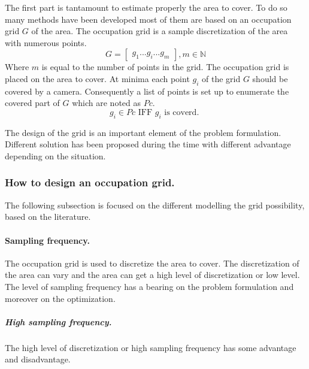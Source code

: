 
The first part is tantamount to estimate properly the area to cover. To do so many methods have been developed most of them are based on an occupation grid $G$ of the area. The occupation grid  is a sample discretization of the area with numerous points.
\begin{equation}\label{eq:Grid}
	G=\begin{bmatrix}
	 	g_1 ...g_i ... g_m
	\end{bmatrix}  , m\in \mathbb{N}
\end{equation}
Where $m$ is equal to the number of points in the grid.
The occupation grid is placed on the area to cover. At minima each point $g_i$ of the grid $G$ should be covered by a camera. Consequently a list of points is set up to enumerate the covered part of $G$ which are noted as $Pc$.
\begin{equation}\label{eq:Pci}
g_i \in Pc \mbox{ IFF } g_i \mbox{ is coverd. }
\end{equation}


The design of the grid is an important element of the problem formulation. Different solution has been proposed during the time with different advantage depending on the situation.\\

\subsubsection{How to design an occupation grid. }%
The following subsection is focused on the different  modelling the grid possibility, based on the literature. 

\paragraph{Sampling frequency.} %
The occupation grid is used to discretize the area to cover. The discretization of the area can vary and the area can get a high level of discretization or low level. The level of sampling frequency has a bearing on the problem formulation and moreover on the optimization.

\subparagraph{High sampling frequency.}
The high level of discretization or high sampling frequency has some advantage and disadvantage.
 
